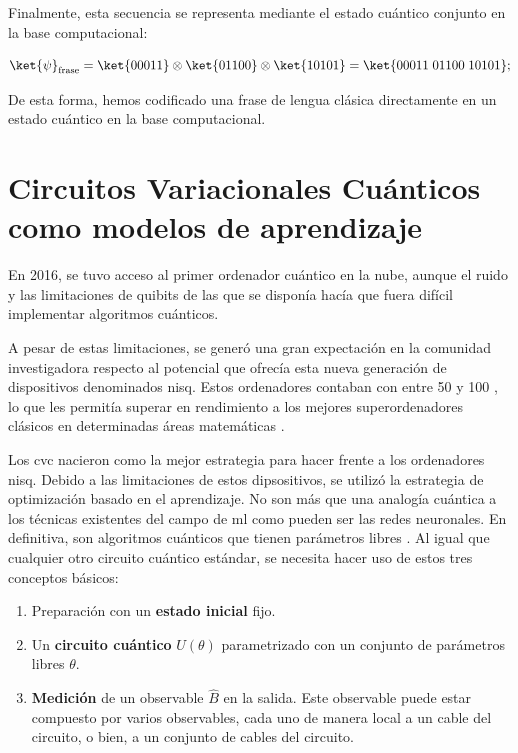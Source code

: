 Finalmente, esta secuencia se representa mediante el estado cuántico conjunto en la base computacional:

\[
  \ket{\psi}_{\text{frase}} = \ket{00011} \otimes \ket{01100} \otimes \ket{10101} = \ket{00011\;01100\;10101};
\]

De esta forma, hemos codificado una frase de lengua clásica directamente en un estado cuántico en la base computacional.

\section{Circuitos Variacionales Cuánticos como modelos de aprendizaje}

En 2016, se tuvo acceso al primer ordenador cuántico en la nube, aunque el ruido y las limitaciones
de quibits de las que se disponía hacía que fuera difícil implementar algoritmos cuánticos.

A pesar de estas limitaciones, se generó una gran expectación en la comunidad investigadora respecto al potencial que ofrecía esta nueva generación de dispositivos denominados \gls{nisq}. Estos ordenadores contaban con entre 50 y 100 , lo que les permitía superar en rendimiento a los mejores superordenadores clásicos en determinadas áreas matemáticas \cite{arute2019quantum,zhong2020quantum}.

Los \gls{cvc} nacieron como la mejor estrategia para hacer frente a los ordenadores \gls{nisq}. Debido a las limitaciones de estos dipsositivos, se utilizó la estrategia de optimización basado en el aprendizaje. No son más que una analogía cuántica a los técnicas existentes del campo de \gls{ml} como pueden ser las redes neuronales. En definitiva, son algoritmos cuánticos que tienen parámetros libres \cite{pennylane_variational_circuit}. Al igual que cualquier otro circuito cuántico estándar, se necesita hacer uso de estos tres conceptos básicos:

\begin{enumerate}
  \item Preparación con un \textbf{estado inicial} fijo.
  \item Un \textbf{circuito cuántico} $U(\theta)$ parametrizado con un conjunto de parámetros libres $\theta$.
  \item \textbf{Medición} de un observable $\hat{B}$ en la salida. Este observable puede estar compuesto por varios observables, cada uno de manera local a un cable del circuito, o bien, a un conjunto de cables del circuito.
\end{enumerate}


